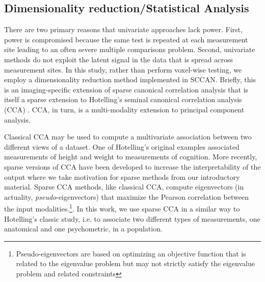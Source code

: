 \documentclass[preprint,authoryear,12pt]{elsarticle}
\begin{document}
\subsection{Dimensionality reduction/Statistical Analysis} 

There are two primary reasons that univariate approaches lack power.  First, power is compromised because the same test is repeated at each measurement site leading to an often severe multiple comparisons problem.  Second, univariate methods do not exploit the latent signal in the data that is spread across measurement sites.  In this study, rather than perform voxel-wise testing, we employ a dimensionality reduction method implemented in SCCAN.  Briefly, this is an imaging-specific extension of sparse canonical correlation analysis \citet{Avants2010,Cao2009,parkhomenko,witten_extensions_2009-1,witten} that is itself a sparse extension to Hotelling's seminal canonical correlation analysis (CCA) \citet{Hotelling1936,hotellingcca}.  CCA, in turn, is a multi-modality extension to  principal component analysis. 

Classical CCA may be used to compute a multivariate association between two different views of a dataset.  One of Hotelling's original examples associated measurements of height and weight to measurements of cognition.  More recently, sparse versions of CCA have been developed to increase the interpretability of the output where we take motivation for sparse methods from our introductory material.  Sparse CCA methods, like classical CCA, compute eigenvectors (in actuality, {\em pseudo}-eigenvectors) that maximize the Pearson correlation between the input modalities.\footnote{Pseudo-eigenvectors are based on optimizing an objective function that is related to the eigenvalue problem but may not strictly satisfy the eigenvalue problem and related constraints}.  In this work, we use sparse CCA in a similar way to Hotelling's classic study, i.e. to associate two different types of measurements, one anatomical and one psychometric, in a population.
\end{document}
